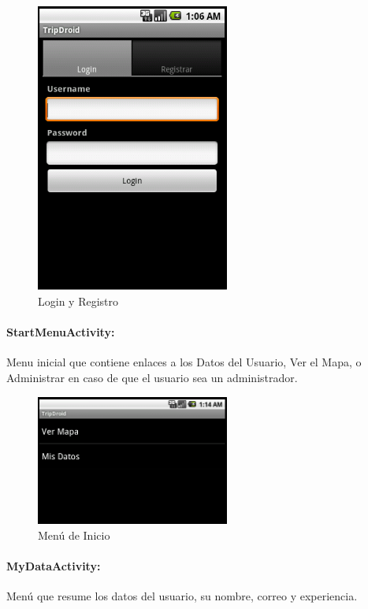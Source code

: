 \documentclass[10pt,letterpaper]{article}
\begin{document}
\begin{figure}[h]
\begin{center}
\includegraphics[width=180pt]{./imgs/TripdroidLogin.png}
\caption{Login y Registro}
\end{center}
\end{figure}

\newpage
\paragraph{StartMenuActivity:} Menu inicial que contiene enlaces a los Datos del Usuario, Ver el Mapa, o Administrar en caso de que el usuario sea un administrador.

\begin{figure}[h]
\begin{center}
\includegraphics[width=180pt]{./imgs/TripdroidStartMenu.png}
\caption{Menú de Inicio}
\end{center}
\end{figure}

\paragraph{MyDataActivity:} Menú que resume los datos del usuario, su nombre, correo y experiencia.
\end{document}
